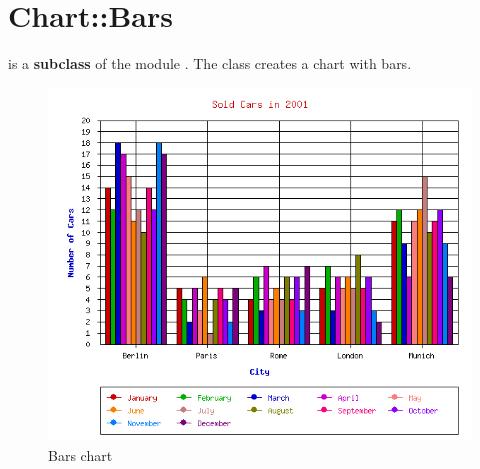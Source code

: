 %
%
\section{Chart::Bars}
\begin{Description} 
    is a \textbf{subclass} of the module .
   The class  creates a chart with bars.
\end{Description}

\begin{figure}[h]
 	\begin{center}
		\includegraphics[scale=0.4]{d_bars.png}
	\end{center}
	\caption{Bars chart}
	\label{fig:bars}
\end{figure}

